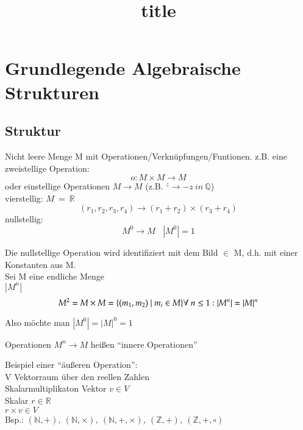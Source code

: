 \documentclass[bibtotoc,11pt,a4paper,]{scrartcl}
\title{\textbf{title}}
\begin{document}
  \section{Grundlegende Algebraische Strukturen}
    \subsection{Struktur}
      Nicht leere Menge M mit Operationen/Verknüpfungen/Funtionen. z.B. eine zweistellige Operation:
      \begin{equation}
        o: M \times M \rightarrow M
      \end{equation}
      oder einstellige Operationen $M \rightarrow M$ (z.B. $^z \rightarrow -z\ in\ \mathbb{Q}$)
      \\
      vierstellig: $M\ =\ \mathbb{R}$
      \begin{equation}
        (r_1, r_2, r_3, r_4) \rightarrow (r_1 + r_2) \times (r_3 + r_4)
      \end{equation}
      nullstellig:
      \begin{equation}
        M^0 \rightarrow M\ \ \ \ |M^0| = 1
      \end{equation}

      Die nullstellige Operation wird identifiziert mit dem Bild $\in$ M, d.h. mit einer Konstanten aus M.\\

      Sei M eine endliche Menge\\
      $|M^n|$\\
      
      \begin{equation}
        M^2 = M \times M = \{(m_1, m_2)\ |\ m_i \in M\}\\
        \forall \ n \le 1 : |M^n| = |M|^n  
      \end{equation}
      
      Also möchte man $|M^0| = |M|^0 = 1$

      Operationen $M^n \rightarrow M$ heißen ``innere Operationen''
      
      Beispiel einer ``äußeren Operation'':\\
      V Vektorraum über den reellen Zahlen\\
      Skalarmultiplikaton
      Vektor $v \in V$\\
      Skalar $r \in \mathbb{R}$\\
      $r \times v \in V$\\
      
      Bsp.: $(\mathbb{N}, +),\ (\mathbb{N}, \times),\ (\mathbb{N}, +, \times),\ (\mathbb{Z}, +),\ (\mathbb{Z}, +, \circ)$
      
\end{document}
